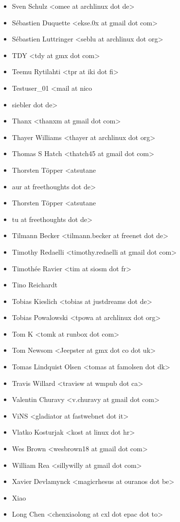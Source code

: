 \begin{itemize}
\item  Sven Schulz <omee at archlinux dot de>
\item  Sébastien Duquette <ekse.0x at gmail dot com>
\item  Sébastien Luttringer <seblu at archlinux dot org>
\item  TDY <tdy at gmx dot com>
\item  Teemu Rytilahti <tpr at iki dot fi>
\item  Testuser\_01 <mail at nico\item siebler dot de>
\item  Thanx <thanxm at gmail dot com>
\item  Thayer Williams <thayer at archlinux dot org>
\item  Thomas S Hatch <thatch45 at gmail dot com>
\item  Thorsten Töpper <atsutane\item aur at freethoughts dot de>
\item  Thorsten Töpper <atsutane\item tu at freethoughts dot de>
\item  Tilmann Becker <tilmann.becker at freenet dot de>
\item  Timothy Redaelli <timothy.redaelli at gmail dot com>
\item  Timothée Ravier <tim at siosm dot fr>
\item  Tino Reichardt
\item  Tobias Kieslich <tobias at justdreams dot de>
\item  Tobias Powalowski <tpowa at archlinux dot org>
\item  Tom K <tomk at runbox dot com>
\item  Tom Newsom <Jeepster at gmx dot co dot uk>
\item  Tomas Lindquist Olsen <tomas at famolsen dot dk>
\item  Travis Willard <travisw at wmpub dot ca>
\item  Valentin Churavy <v.churavy at gmail dot com>
\item  ViNS <gladiator at fastwebnet dot it>
\item  Vlatko Kosturjak <kost at linux dot hr>
\item  Wes Brown <wesbrown18 at gmail dot com>
\item  William Rea <sillywilly at gmail dot com>
\item  Xavier Devlamynck <magicrhesus at ouranos dot be>
\item  Xiao\item Long Chen <chenxiaolong at cxl dot epac dot to>

\end{itemize}
